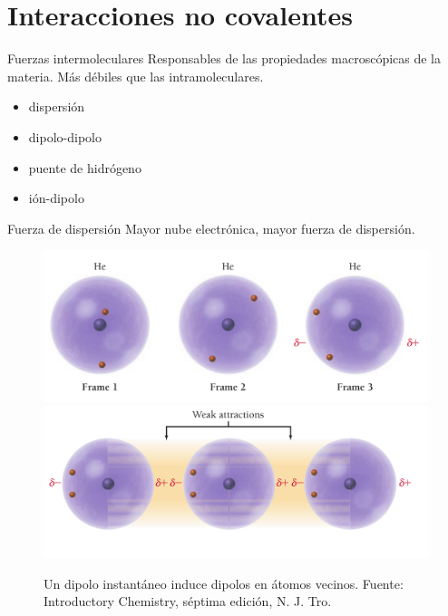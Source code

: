 \documentclass{beamer}
\begin{document}
\section{Interacciones no covalentes}
\begin{frame}{Fuerzas intermoleculares}
  Responsables de las propiedades macroscópicas de la materia. Más débiles que las intramoleculares.
  \begin{itemize}
    \item dispersión
    \item dipolo-dipolo
    \item puente de hidrógeno
    \item ión-dipolo
  \end{itemize}
\end{frame}
\begin{frame}{Fuerza de dispersión}
  Mayor nube electrónica, mayor fuerza de dispersión.
  \begin{figure}
    \centering
    \includegraphics[width=0.7\linewidth]{imgs/dispersionforce01}
    \includegraphics[width=0.7\linewidth]{imgs/dispersionforce02}
    \caption{Un dipolo instantáneo induce dipolos en átomos vecinos. Fuente: Introductory Chemistry, séptima edición, N. J. Tro.}
    \label{fig:dispersionforce01}
  \end{figure}
\end{frame}
\end{document}
